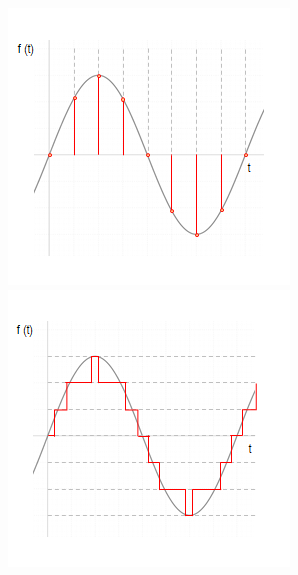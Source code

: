 \documentclass[a4paper, 12pt]{article}
\begin{document}
\begin{figure}[ht!]
\begin{minipage}[c]{5cm}
  \includegraphics[width=\linewidth]{vzorkovaný.png}
  \subcaption{}
\end{minipage}\vspace{0.25cm}
\begin{minipage}[b]{5cm}
  \centering
  \includegraphics[width=\linewidth]{kvantovaný.png}

\end{minipage}
\end{figure}
\end{document}
